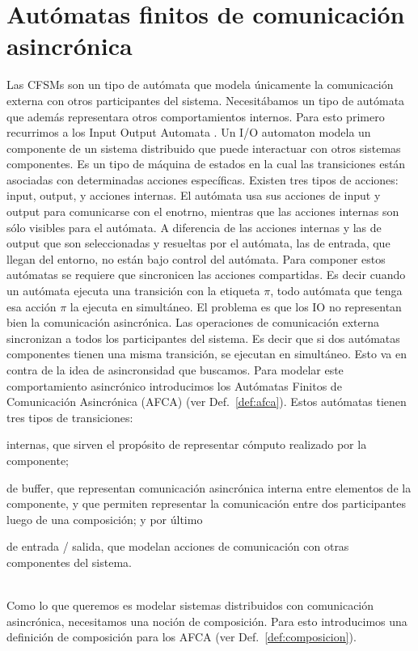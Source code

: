 \section{Autómatas finitos de comunicación asincrónica}
Las CFSMs son un tipo de autómata que modela únicamente la comunicación externa con otros participantes del sistema. Necesitábamos un tipo de autómata que además representara otros comportamientos internos. Para esto primero recurrimos a los Input Output Automata \cite{lynch:cwiq-2_3}. 
Un I/O automaton modela un componente de un sistema distribuido que puede interactuar con otros sistemas componentes. Es un tipo de máquina de estados en la cual las transiciones están asociadas con determinadas acciones específicas. Existen tres tipos de acciones: input, output, y acciones internas. El autómata usa sus acciones de input y output para comunicarse con el enotrno, mientras que las acciones internas son sólo visibles para el autómata. A diferencia de las acciones internas y las de output que son seleccionadas y resueltas por el autómata, las de entrada, que llegan del entorno, no están bajo control del autómata. Para componer estos autómatas se requiere que sincronicen las acciones compartidas. Es decir cuando un autómata ejecuta una transición con la etiqueta $\pi$, todo autómata que tenga esa acción $\pi$ la ejecuta en simultáneo.
El problema es que los IO no representan bien la comunicación asincrónica. Las operaciones de comunicación externa sincronizan a todos los participantes del sistema. Es decir que si dos autómatas componentes tienen una misma transición, se ejecutan en simultáneo. Esto va en contra de la idea de asincronsidad que buscamos.
Para modelar este comportamiento asincrónico introducimos los Autómatas Finitos de Comunicación Asincrónica (AFCA) (ver Def.~\ref{def:afca}). Estos autómatas tienen tres tipos de transiciones: 
\begin{inparaenum}[1)]
\item internas, que sirven el propósito de representar cómputo realizado por la componente; 
\item de buffer, que representan comunicación asincrónica interna entre elementos de la componente, y que permiten representar la comunicación entre dos participantes luego de una composición; y por último 
\item de entrada / salida, que modelan acciones de comunicación con otras componentes del sistema.
\end{inparaenum} \\
Como lo que queremos es modelar sistemas distribuidos con comunicación asincrónica, necesitamos una noción de composición. Para esto introducimos una definición de composición para los AFCA (ver Def.~\ref{def:composicion}). 

